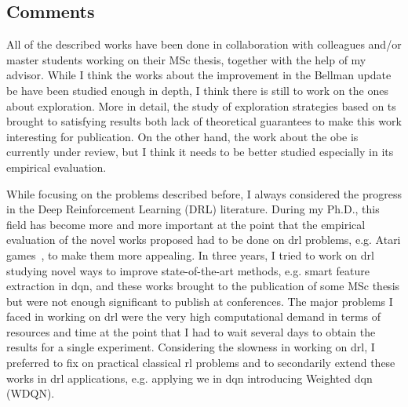 \subsection{Comments}
All of the described works have been done in collaboration with colleagues and/or master students working on their MSc thesis, together with the help of my advisor. While I think the works about the improvement in the Bellman update \gls{be} have been studied enough in depth, I think there is still to work on the ones about exploration. More in detail, the study of exploration strategies based on \gls{ts} brought to satisfying results both lack of theoretical guarantees to make this work interesting for publication. On the other hand, the work about the \gls{obe} is currently under review, but I think it needs to be better studied especially in its empirical evaluation.

While focusing on the problems described before, I always considered the progress in the Deep Reinforcement Learning (DRL) literature. During my Ph.D., this field has become more and more important at the point that the empirical evaluation of the novel works proposed had to be done on \gls{drl} problems, e.g. Atari games~\cite{bellemare13arcade}, to make them more appealing. In three years, I tried to work on \gls{drl} studying novel ways to improve state-of-the-art methods, e.g. smart feature extraction in \gls{dqn}, and these works brought to the publication of some MSc thesis but were not enough significant to publish at conferences. The major problems I faced in working on \gls{drl} were the very high computational demand in terms of resources and time at the point that I had to wait several days to obtain the results for a single experiment. Considering the slowness in working on \gls{drl}, I preferred to fix on practical classical \gls{rl} problems and to secondarily extend these works in \gls{drl} applications, e.g. applying \gls{we} in \gls{dqn} introducing Weighted \gls{dqn} (WDQN).

